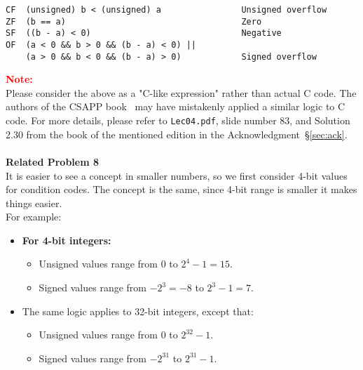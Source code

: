 \begin{Verbatim}[frame=single]
CF  (unsigned) b < (unsigned) a                Unsigned overflow
ZF  (b == a)                                   Zero
SF  ((b - a) < 0)                              Negative
OF  (a < 0 && b > 0 && (b - a) < 0) || 
    (a > 0 && b < 0 && (b - a) > 0)            Signed overflow
\end{Verbatim}
\noindent\textbf{\textcolor{red}{Note:}} \\
Please consider the above as a "C-like expression" rather than actual C code. 
The authors of the CSAPP book~\cite{bryant2016csapp} may have mistakenly applied a similar logic to C code. For more 
details, please refer to \texttt{Lec04.pdf}, slide number 83, and Solution 2.30
from the book of the mentioned edition in the Acknowledgment~\S\ref{sec:ack}. \\
\\
\noindent\textbf{Related Problem 8} \\
It is easier to see a concept in smaller numbers, so we first consider 4-bit 
values for condition codes. The concept is the same, since 4-bit range is 
smaller it makes things easier. \\

For example: 
\begin{itemize}
    \item \textbf{For 4-bit integers:}
    \begin{itemize}
        \item Unsigned values range from $0$ to $2^4 - 1 = 15$.
        \item Signed values range from $-2^3 = -8$ to $2^3 - 1 = 7$.
    \end{itemize}
    \item The same logic applies to 32-bit integers, except that:
    \begin{itemize}
        \item Unsigned values range from $0$ to $2^{32} - 1$.
        \item Signed values range from $-2^{31}$ to $2^{31} - 1$.
    \end{itemize}
\end{itemize}

